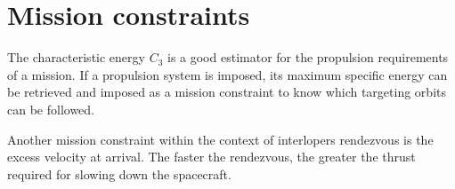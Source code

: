 \section{Mission constraints}

The characteristic energy $C_3$ is a good estimator for the propulsion
requirements of a mission. If a propulsion system is imposed, its maximum
specific energy can be retrieved and imposed as a mission constraint to know
which targeting orbits can be followed.

Another mission constraint within the context of interlopers rendezvous is the
excess velocity at arrival. The faster the rendezvous, the greater the thrust
required for slowing down the spacecraft.
